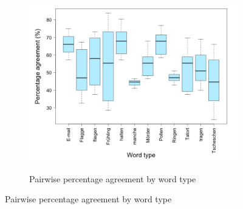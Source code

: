 		
		\begin{figure}[phtb]
			\centering
			
%			

					
			
			\begin{subfigure}{\textwidth}
				\centering
				\caption{Pairwise percentage agreement by word type}
				\includegraphics[width=\textwidth]{img/plots/pairwisePctByWord-noTitle}
				\label{fig:agreement:words:pct}
			\end{subfigure}%
			
			\vspace{1em}
			

\end{figure}

